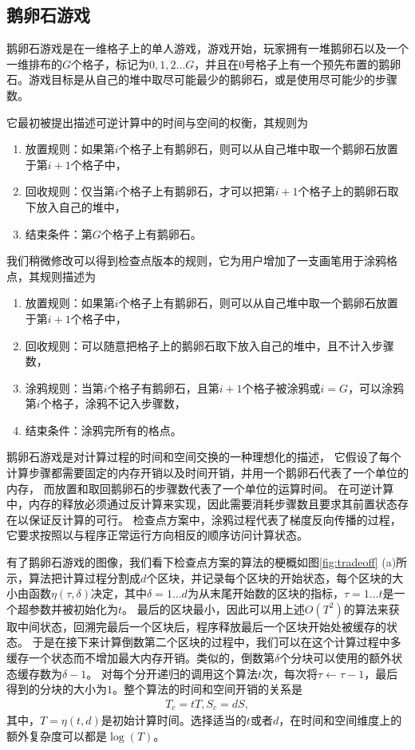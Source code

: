 \documentclass[A4,twoside,fontset=ubuntu,UTF8]{ctexart}
\begin{document}
\subsection{鹅卵石游戏}
鹅卵石游戏是在一维格子上的单人游戏，游戏开始，玩家拥有一堆鹅卵石以及一个一维排布的$G$个格子，标记为$0,1,2\ldots G$，并且在$0$号格子上有一个预先布置的鹅卵石。游戏目标是从自己的堆中取尽可能最少的鹅卵石，或是使用尽可能少的步骤数。

它最初被提出描述可逆计算中的时间与空间的权衡，其规则为
\begin{enumerate}
    \item 放置规则：如果第$i$个格子上有鹅卵石，则可以从自己堆中取一个鹅卵石放置于第$i+1$个格子中，
    \item 回收规则：仅当第$i$个格子上有鹅卵石，才可以把第$i+1$个格子上的鹅卵石取下放入自己的堆中，
    \item 结束条件：第$G$个格子上有鹅卵石。
\end{enumerate}

我们稍微修改可以得到检查点版本的规则，它为用户增加了一支画笔用于涂鸦格点，其规则描述为
\begin{enumerate}
    \item 放置规则：如果第$i$个格子上有鹅卵石，则可以从自己堆中取一个鹅卵石放置于第$i+1$个格子中，
    \item 回收规则：可以随意把格子上的鹅卵石取下放入自己的堆中，且不计入步骤数，
    \item 涂鸦规则：当第$i$个格子有鹅卵石，且第$i+1$个格子被涂鸦或$i=G$，可以涂鸦第$i$个格子，涂鸦不记入步骤数，
    \item 结束条件：涂鸦完所有的格点。
\end{enumerate}

鹅卵石游戏是对计算过程的时间和空间交换的一种理想化的描述，
它假设了每个计算步骤都需要固定的内存开销以及时间开销，并用一个鹅卵石代表了一个单位的内存，
而放置和取回鹅卵石的步骤数代表了一个单位的运算时间。
在可逆计算中，内存的释放必须通过反计算来实现，因此需要消耗步骤数且要求其前置状态存在以保证反计算的可行。
检查点方案中，涂鸦过程代表了梯度反向传播的过程，它要求按照以与程序正常运行方向相反的顺序访问计算状态。

有了鹅卵石游戏的图像，我们看下检查点方案的算法的梗概如图\ref{fig:tradeoff} (a)所示，算法把计算过程分割成$d$个区块，并记录每个区块的开始状态，每个区块的大小由函数$\eta(\tau, \delta)$决定，其中$\delta=1\ldots d$为从末尾开始数的区块的指标，$\tau = 1\ldots t$是一个超参数并被初始化为$t$。
最后的区块最小，因此可以用上述$O(T^2)$的算法来获取中间状态，回溯完最后一个区块后，程序释放最后一个区块开始处被缓存的状态。
于是在接下来计算倒数第二个区块的过程中，我们可以在这个计算过程中多缓存一个状态而不增加最大内存开销。类似的，倒数第$\delta$个分块可以使用的额外状态缓存数为$\delta-1$。
对每个分开递归的调用这个算法$t$次，每次将$\tau\leftarrow \tau-1$，最后得到的分块的大小为$1$。整个算法的时间和空间开销的关系是
\begin{align}
    T_c = tT, S_c = dS,
\end{align}
其中，$T = \eta(t, d)$是初始计算时间。选择适当的$t$或者$d$，在时间和空间维度上的额外复杂度可以都是$\log(T)$。
\end{document}

